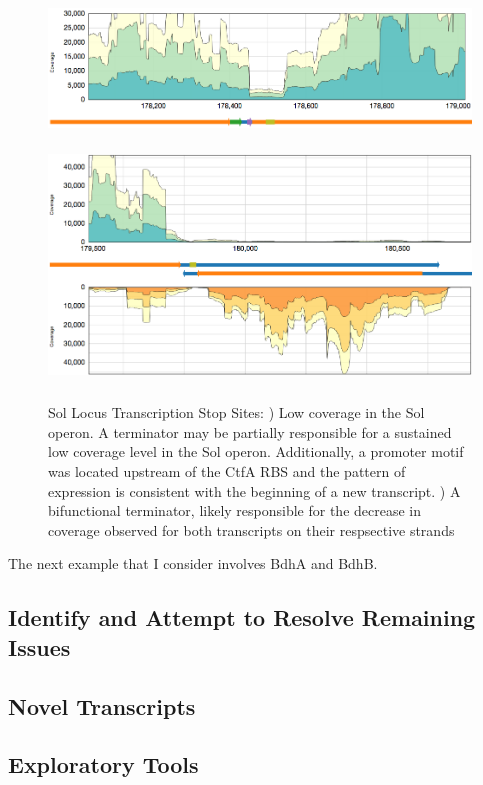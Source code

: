 \begin{figure}
{\includegraphics[width=\textwidth,height=1.5in]{images/Assembly/Sol/Sol-AdhE-terminator.png}
\label{fig:3a}}
{\includegraphics[width=\textwidth,height=2.5in]{images/Assembly/Sol/Sol-bifunctional-terminator}
\label{fig:3b}}
\caption{Sol Locus Transcription Stop Sites: ) Low coverage in the Sol operon. A terminator may be partially responsible for a sustained low coverage level in the Sol operon. Additionally, a promoter motif was located upstream of the CtfA RBS and the pattern of expression is consistent with the beginning of a new transcript. ) A bifunctional terminator, likely responsible for the decrease in coverage observed for both transcripts on their respsective strands}
\end{figure}

The next example that I consider involves BdhA and BdhB.


\subsection{Identify and Attempt to Resolve Remaining Issues}

\subsection{Novel Transcripts}

\subsection{Exploratory Tools}


